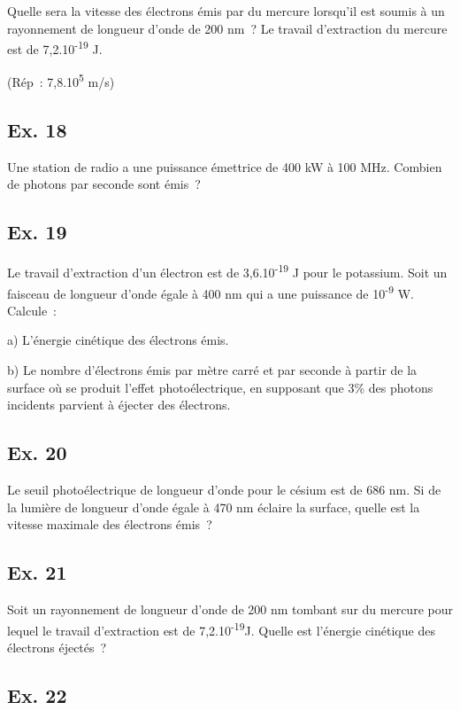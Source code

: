 {Quelle sera la vitesse des électrons émis par du mercure lorsqu'il est
soumis à un rayonnement de longueur d'onde de 200 nm~? Le travail
d'extraction du mercure est de 7,2.10\textsuperscript{-19} J.

(Rép~: 7,8.10\textsuperscript{5} m/s)

\subsection{Ex. 18}

Une station de radio a une puissance émettrice de 400 kW à 100 MHz.
Combien de photons par seconde sont émis~?

\subsection{Ex. 19}

Le travail d'extraction d'un électron est de 3,6.10\textsuperscript{-19}
J pour le potassium. Soit un faisceau de longueur d'onde égale à 400 nm
qui a une puissance de 10\textsuperscript{-9} W. Calcule~:

a) L'énergie cinétique des électrons émis.

b) Le nombre d'électrons émis par mètre carré et par seconde à partir de
la surface où se produit l'effet photoélectrique, en supposant que 3\%
des photons incidents parvient à éjecter des électrons.

\subsection{Ex. 20}

Le seuil photoélectrique de longueur d'onde pour le césium est de 686
nm. Si de la lumière de longueur d'onde égale à 470 nm éclaire la
surface, quelle est la vitesse maximale des électrons émis~?

\subsection{Ex. 21}

Soit un rayonnement de longueur d'onde de 200 nm tombant sur du mercure
pour lequel le travail d'extraction est de 7,2.10\textsuperscript{-19}J.
Quelle est l'énergie cinétique des électrons éjectés~?

\subsection{Ex. 22}

}
